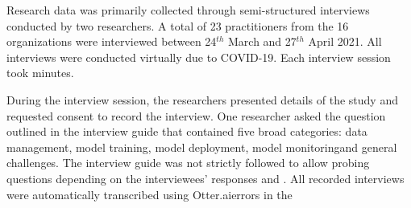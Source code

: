 \DIFdelend Research data was primarily collected through semi-structured interviews conducted by two researchers. A total of 23 practitioners from the 16 organizations were interviewed between 24$^{th}$ March and 27$^{th}$ April 2021. All interviews were conducted virtually due to COVID-19. Each interview session took\DIFdelbegin {}\DIFdelend \DIFaddbegin {} minutes. 

During the interview session, the researchers presented details of the study and requested consent to record the interview. One researcher asked the question outlined in the interview guide that contained five broad categories: data management, model training, model deployment, model monitoring\DIFaddbegin \DIFadd{, }\DIFaddend and general challenges. The interview guide was not strictly followed to allow probing questions depending on the interviewees' responses and \DIFdelbegin {}\DIFdelend \DIFaddbegin {}\DIFaddend . All recorded interviews were automatically transcribed using Otter.ai\DIFdelbegin {}\DIFdelend \DIFaddbegin {}\DIFaddend errors in the \DIFdelbegin {}\DIFdelend \DIFaddbegin {}\DIFaddend 



